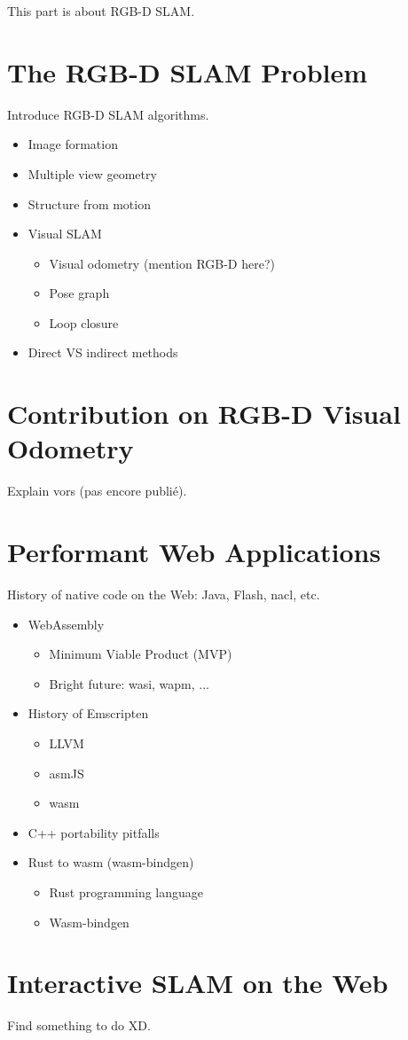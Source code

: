 This part is about RGB-D SLAM\@.

\chapter{The RGB-D SLAM Problem}%
\label{cha:the_rgb_d_slam_problem}

Introduce RGB-D SLAM algorithms.

\begin{itemize}
	\item Image formation
	\item Multiple view geometry
	\item Structure from motion
	\item Visual SLAM
	\begin{itemize}
		\item Visual odometry (mention RGB-D here?)
		\item Pose graph
		\item Loop closure
	\end{itemize}
	\item Direct VS indirect methods
\end{itemize}

\chapter{Contribution on RGB-D Visual Odometry}%
\label{cha:contribution_on_rgb_d_visual_odometry}

Explain vors (pas encore publié).

\chapter{Performant Web Applications}%
\label{cha:performant_web_applications}

History of native code on the Web: Java, Flash, nacl, etc.

\begin{itemize}
	\item WebAssembly
	\begin{itemize}
		\item Minimum Viable Product (MVP)
		\item Bright future: wasi, wapm, ...
	\end{itemize}
	\item History of Emscripten
	\begin{itemize}
		\item LLVM
		\item asmJS
		\item wasm
	\end{itemize}
	\item C++ portability pitfalls
	\item Rust to wasm (wasm-bindgen)
	\begin{itemize}
		\item Rust programming language
		\item Wasm-bindgen
	\end{itemize}
\end{itemize}

\chapter{Interactive SLAM on the Web}%
\label{cha:interactive_slam_on_the_web}

Find something to do XD\@.

